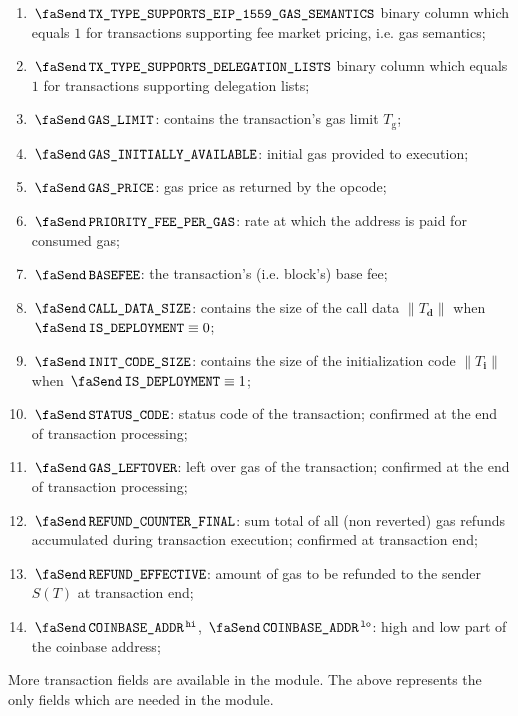 \begin{enumerate}
		binary column; equals $0$ \emph{iff} the transaction is a message call ($T_\text{t} \neq \varnothing$); equals $1$ if and only if the transaction is a contract deployment transaction ($T_{\text{t}} = \varnothing$.)
	\item
		\godGiven{}
		$\txTypeSupportsEipFifteenFiftyNineGasSemantics$
		binary column which equals $1$ for transactions supporting fee market pricing,
		i.e. \cite{EIP-1559} gas semantics;
	\item
		\godGiven{}
		$\txTypeSupportsDelegationLists$
		binary column which equals $1$ for transactions supporting delegation lists;
	\item
		\godGiven{}
		$\txGasLimit$:
		contains the transaction's gas limit $T_\text{g}$;
	\item
		\godGiven{}
		$\txInitialGas$:
		initial gas provided to execution;
	\item
		\godGiven{}
		$\txGasPrice$:
		gas price as returned by the  opcode;
	\item
		\godGiven{}
		$\txPriorityFeePerGas$:
		rate at which the  address is paid for consumed gas;
	\item
		\godGiven{}
		$\txBasefee$:
		the transaction's (i.e. block's) base fee;
	\item
		\godGiven{}
		$\txCallDataSize$:
		contains the size of the call data $\|T_\textbf{d}\|$ when $\txIsDeployment \equiv 0$;
	\item
		\godGiven{}
		$\txInitCodeSize$:
		contains the size of the initialization code $\|T_\textbf{i}\|$ when $\txIsDeployment \equiv 1$;
	\item
		\godGiven{}
		\markAsJustifiedHere{}
		$\txStatusCode$:
		status code of the transaction; confirmed at the end of transaction processing;
	\item
		\godGiven{}
		\markAsJustifiedHere{}
		$\txLeftoverGas$:
		left over gas of the transaction; confirmed at the end of transaction processing;
	\item
		\godGiven{}
		\markAsJustifiedHere{}
		$\txFinalRefundCounter$:
		sum total of all (non reverted) gas refunds accumulated during transaction execution; confirmed at transaction end;
	\item
		\godGiven{}
		$\txEffectiveRefund$:
		amount of gas to be refunded to the sender $S(T)$ at transaction end;
	\item
		\godGiven{}
		$\txCoinbase\high$, $\txCoinbase\low$:
		high and low part of the coinbase address;
\end{enumerate}
\saNote{}
More transaction fields are available in the \userTxnDataMod{} module. The above represents the only fields which are needed in the \hubMod{} module.

